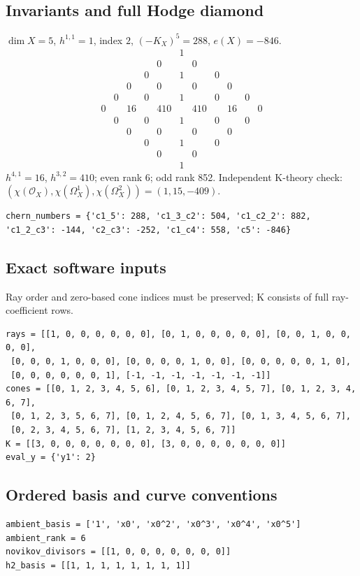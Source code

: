 \documentclass[10pt,a4paper]{article}
\begin{document}
\subsection*{Invariants and full Hodge diamond}
$\dim X=5$, $h^{1,1}=1$, index $2$, $(-K_X)^5=288$, $e(X)=-846$.
\[\begin{array}{ccccccccccc}&&&&&1&&&&&\\&&&&0&&0&&&&\\&&&0&&1&&0&&&\\&&0&&0&&0&&0&&\\&0&&0&&1&&0&&0&\\0&&16&&410&&410&&16&&0\\&0&&0&&1&&0&&0&\\&&0&&0&&0&&0&&\\&&&0&&1&&0&&&\\&&&&0&&0&&&&\\&&&&&1&&&&&\end{array}\]
$h^{4,1}=16$, $h^{3,2}=410$; even rank 6; odd rank 852.
Independent K-theory check: $(\chi(\mathcal O_X),\chi(\Omega_X^1),\chi(\Omega_X^2))=(1, 15, -409)$.
\begin{lstlisting}
chern_numbers = {'c1_5': 288, 'c1_3_c2': 504, 'c1_c2_2': 882, 'c1_2_c3': -144, 'c2_c3': -252, 'c1_c4': 558, 'c5': -846}
\end{lstlisting}
\subsection*{Exact software inputs}
Ray order and zero-based cone indices must be preserved; K consists of full ray-coefficient rows.
\begin{lstlisting}
rays = [[1, 0, 0, 0, 0, 0, 0], [0, 1, 0, 0, 0, 0, 0], [0, 0, 1, 0, 0, 0, 0],
 [0, 0, 0, 1, 0, 0, 0], [0, 0, 0, 0, 1, 0, 0], [0, 0, 0, 0, 0, 1, 0],
 [0, 0, 0, 0, 0, 0, 1], [-1, -1, -1, -1, -1, -1, -1]]
cones = [[0, 1, 2, 3, 4, 5, 6], [0, 1, 2, 3, 4, 5, 7], [0, 1, 2, 3, 4, 6, 7],
 [0, 1, 2, 3, 5, 6, 7], [0, 1, 2, 4, 5, 6, 7], [0, 1, 3, 4, 5, 6, 7],
 [0, 2, 3, 4, 5, 6, 7], [1, 2, 3, 4, 5, 6, 7]]
K = [[3, 0, 0, 0, 0, 0, 0, 0], [3, 0, 0, 0, 0, 0, 0, 0]]
eval_y = {'y1': 2}
\end{lstlisting}
\subsection*{Ordered basis and curve conventions}
\begin{lstlisting}
ambient_basis = ['1', 'x0', 'x0^2', 'x0^3', 'x0^4', 'x0^5']
ambient_rank = 6
novikov_divisors = [[1, 0, 0, 0, 0, 0, 0, 0]]
h2_basis = [[1, 1, 1, 1, 1, 1, 1, 1]]
\end{lstlisting}
\end{document}

